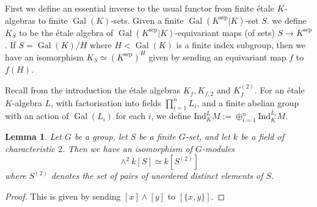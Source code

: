 \documentclass[11pt]{amsart}
\theoremstyle{plain}
\newtheorem{lemma}{Lemma}
\theoremstyle{definition}
\DeclareMathOperator{\Gal}{Gal}
\newcommand{\Ind}{\mathrm{Ind}}
\newcommand{\sep}{\mathrm{sep}}
\begin{document}
First we define an essential inverse to the usual functor from finite \'etale $K$-algebras to finite $\Gal (K)$-sets. 
Given a finite $\Gal (K^{\sep }|K)$-set $S$. we define $K_S$ to be the \'etale algebra of $\Gal (K^{\sep }|K)$-equivariant maps (of sets) $S\to K^{\sep }$. If $S=\Gal (K)/H$ where $H<\Gal (K)$ is a finite index subgroup, then we have an isomorphism $K_S \simeq (K^{\sep })^H$ given by sending an equivariant map $f$ to $f(H)$.

Recall from the introduction the \'etale algebras $K_f ,K_{f,2}$ and $K_f ^{(2)}$. For an \'etale $K$-algebra $L$, with factorisation into fields $\prod _{i=1}^n L_i $, and a finite abelian group with an action of $\Gal (L_i )$ for each $i$, we define $\Ind ^L _K M:=\oplus _{i=1}^n \Ind ^{L_i }_K M$.

\begin{lemma}
Let $G$ be a group, let $S$ be a finite $G$-set, and let $k$ be a field of characteristic $2$. Then we have an isomorphism of $G$-modules
\[
\wedge ^2 k[S]\simeq k[S^{(2)}]
\]
where $S^{(2)}$ denotes the set of pairs of unordered distinct elements of $S$.
\end{lemma}
\begin{proof}
This is given by sending $[x]\wedge [y]$ to $[\{ x,y\} ]$.
\end{proof}
\end{document}

